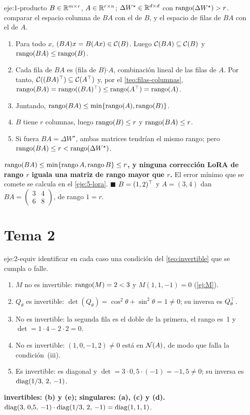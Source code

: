 \begin{solucion}{eje:1-producto}
\datos $B\in\mathbb{R}^{m\times r}$, $A\in\mathbb{R}^{r\times n}$; $\Delta W^{\star}\in\mathbb{R}^{d\times d}$ con $\operatorname{rango}(\Delta W^{\star})>r$.
\planteamiento comparar el espacio columna de $BA$ con el de $B$, y el espacio de filas de $BA$ con el de $A$.
\pasos
\begin{enumerate}[label=\arabic*.]
  \item Para todo $x$, $(BA)x=B(Ax)\in\mathcal{C}(B)$. Luego $\mathcal{C}(BA)\subseteq\mathcal{C}(B)$ y $\operatorname{rango}(BA)\le\operatorname{rango}(B)$.
  \item Cada fila de $BA$ es (fila de $B$)$\cdot A$, combinación lineal de las filas de $A$. Por tanto, $\mathcal{C}((BA)^{\top})\subseteq\mathcal{C}(A^{\top})$ y, por el \cref{teo:filas-columnas}, $\operatorname{rango}(BA)=\operatorname{rango}((BA)^{\top})\le\operatorname{rango}(A^{\top})=\operatorname{rango}(A)$.
  \item Juntando, $\operatorname{rango}(BA)\le\min\{\operatorname{rango}(A),\operatorname{rango}(B)\}$.
  \item $B$ tiene $r$ columnas, luego $\operatorname{rango}(B)\le r$ y $\operatorname{rango}(BA)\le r$.
  \item Si fuera $BA=\Delta W^{\star}$, ambas matrices tendrían el mismo rango; pero $\operatorname{rango}(BA)\le r<\operatorname{rango}(\Delta W^{\star})$.
\end{enumerate}
\resultado \textbf{$\operatorname{rango}(BA)\le\min\{\operatorname{rango} A,\operatorname{rango} B\}\le r$, y ninguna corrección LoRA de rango $r$ iguala una matriz de rango mayor que $r$.} El error mínimo que se comete se calcula en el \cref{eje:5-lora}. \hfill$\blacksquare$
\comprobacion $B=(1,2)^{\top}$ y $A=(3,4)$ dan $BA=\begin{pmatrix}3&4\\6&8\end{pmatrix}$, de rango $1=r$.
\end{solucion}

\section{Tema 2}

\begin{solucion}{eje:2-equiv}
\planteamiento identificar en cada caso una condición del \cref{teo:invertible} que se cumpla o falle.
\pasos
\begin{enumerate}[label=(\alph*)]
  \item $M$ no es invertible: $\operatorname{rango}(M)=2<3$ y $M(1,1,-1)=0$ (\cref{ej:M}).
  \item $Q_\theta$ es invertible: $\det(Q_\theta)=\cos^{2}\theta+\sin^{2}\theta=1\ne 0$; su inversa es $Q_\theta^{\top}$.
  \item No es invertible: la segunda fila es el doble de la primera, el rango es~1 y $\det=1\cdot 4-2\cdot 2=0$.
  \item No es invertible: $(1,0,-1,2)\ne 0$ está en $\mathcal{N}(A)$, de modo que falla la condición~(iii).
  \item Es invertible: es diagonal y $\det=3\cdot 0{,}5\cdot(-1)=-1{,}5\ne 0$; su inversa es $\operatorname{diag}(1/3,\,2,\,-1)$.
\end{enumerate}
\resultado \textbf{invertibles: (b) y (e); singulares: (a), (c) y (d).}
\comprobacion $\operatorname{diag}(3,\,0{,}5,\,-1)\cdot\operatorname{diag}(1/3,\,2,\,-1)=\operatorname{diag}(1,1,1)$.
\end{solucion}

